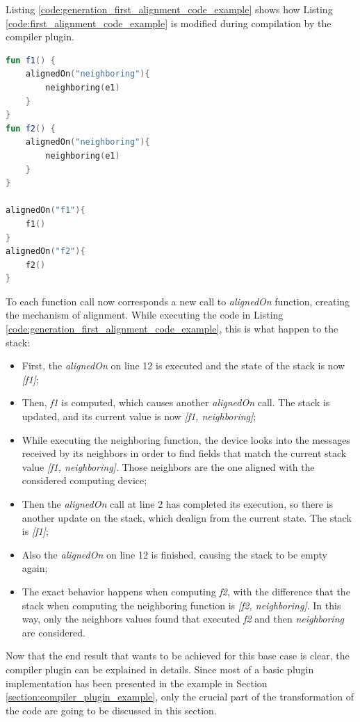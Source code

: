 Listing \ref{code:generation_first_alignment_code_example} shows how Listing \ref{code:first_alignment_code_example} is modified during compilation by the compiler plugin.
\begin{lstlisting}[caption={Generation goal to handle the alignment of Listing \ref{code:first_alignment_code_example}}, captionpos=b, language=Kotlin, label={code:generation_first_alignment_code_example}]
fun f1() {
    alignedOn("neighboring"){
        neighboring(e1)
    }
}
fun f2() {
    alignedOn("neighboring"){
        neighboring(e1)
    }
}
            
alignedOn("f1"){
    f1()
}
alignedOn("f2"){
    f2()
}
\end{lstlisting}
To each function call now corresponds a new call to \textit{alignedOn} function, creating the mechanism of alignment.\newline
While executing the code in Listing \ref{code:generation_first_alignment_code_example}, this is what happen to the stack:
\begin{itemize}
    \item First, the \textit{alignedOn} on line 12 is executed and the state of the stack is now \textit{[f1]};
    \item Then, \textit{f1} is computed, which causes another \textit{alignedOn} call. The stack is updated, and its current value is now \textit{[f1, neighboring]};
    \item While executing the neighboring function, the device looks into the messages received by its neighbors in order to find fields that match the current stack value \textit{[f1, neighboring]}. Those neighbors are the one aligned with the considered computing device;
    \item Then the \textit{alignedOn} call at line 2 has completed its execution, so there is another update on the stack, which dealign from the current state. The stack is \textit{[f1]};
    \item Also the \textit{alignedOn} on line 12 is finished, causing the stack to be empty again;
    \item The exact behavior happens when computing \textit{f2}, with the difference that the stack when computing the neighboring function is \textit{[f2, neighboring]}. In this way, only the neighbors values found that executed \textit{f2} and then \textit{neighboring} are considered.
\end{itemize}

Now that the end result that wants to be achieved for this base case is clear, the compiler plugin can be explained in details.\newline
Since most of a basic plugin implementation has been presented in the example in Section \ref{section:compiler_plugin_example}, only the crucial part of the transformation of the code are going to be discussed in this section.

